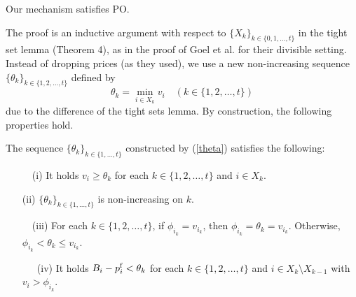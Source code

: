 \documentclass[letterpaper,11pt]{article}
\begin{document}
	\begin{theorem}
	\label{PO}
	Our mechanism satisfies PO.
	\end{theorem}

The proof is an inductive argument with respect to $\{X_k\}_{k\in \{0,1,\ldots,t\}}$ 
in the tight set lemma (Theorem 4), as in the proof of Goel et al. \cite{GMP2014} for their divisible setting.
Instead of dropping prices (as they used),  
we use a new non-increasing sequence $\{\theta_k\}_{k\in \{1,2,\ldots,t\}}$ defined by  
\begin{equation}
\label{theta}
\theta_k=\displaystyle \min_{i\in X_{k}}v_{i}\quad (k\in \{1,2,\ldots,t\})  
\end{equation}
due to the difference of the tight sets lemma.
By construction, the following properties hold.  






\begin{lemma}
\label{prepare_PO}
The sequence $\{\theta_k\}_{k\in \{1,\ldots,t\}}$ constructed by (\ref{theta}) satisfies the following: 
\begin{itemize}
\item[\ \ (i)] It holds $v_i\geq \theta_{k}$ for each $k\in\{1,2,\ldots,t\}$ and $i\in X_k$.
\item[(ii)] $\{\theta_{k}\}_{k\in \{1,\ldots,t\}}$ is non-increasing on $k$.
\item[\ \ (iii)] For each $k\in\{1,2,\ldots,t\}$, if $\phi_{i_k}=v_{i_k}$, then $\phi_{i_k}=\theta_{k}=v_{i_k}$.
Otherwise, $\phi_{i_k}<\theta_{k}\leq v_{i_k}$.
\item[\ \ \ (iv)] It holds $B_i-p^{\rm f}_i<\theta_{k}$ for each $k\in\{1,2,\ldots,t\}$ and $i\in X_k\setminus X_{k-1}$ with $v_i>\phi_{i_k}$.
\end{itemize}
\end{lemma}
\end{document}
